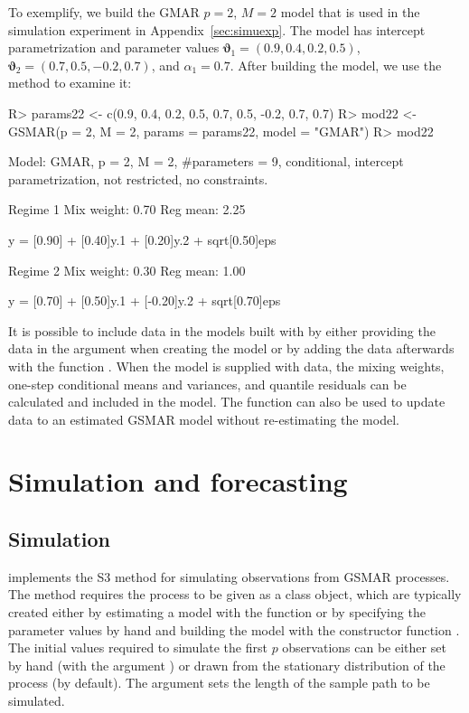 \documentclass[nojss]{jss} %
\begin{document}
To exemplify, we build the GMAR $p=2$, $M=2$ model that is used in the simulation experiment in Appendix~\ref{sec:simuexp}. The model has intercept parametrization and parameter values $\boldsymbol{\vartheta}_1 = (0.9, 0.4, 0.2, 0.5)$, $\boldsymbol{\vartheta}_2 = (0.7, 0.5, -0.2, 0.7)$, and $\alpha_1 = 0.7$. After building the model, we use the  method to examine it:
%
\begin{CodeChunk}
\begin{CodeInput}
R> params22 <- c(0.9, 0.4, 0.2, 0.5, 0.7, 0.5, -0.2, 0.7, 0.7)
R> mod22 <- GSMAR(p = 2, M = 2, params = params22, model = "GMAR")
R> mod22
\end{CodeInput}
\begin{CodeOutput}
Model:
 GMAR, p = 2, M = 2, #parameters = 9,
 conditional, intercept parametrization, not restricted, no constraints.

Regime 1
Mix weight: 0.70
Reg mean: 2.25

y = [0.90] + [0.40]y.1 + [0.20]y.2 + sqrt[0.50]eps

Regime 2
Mix weight: 0.30
Reg mean: 1.00

y = [0.70] + [0.50]y.1 + [-0.20]y.2 + sqrt[0.70]eps
\end{CodeOutput}
\end{CodeChunk}
%

It is possible to include data in the models built with  by either providing the data in the argument  when creating the model or by adding the data afterwards with the function . When the model is supplied with data, the mixing weights, one-step conditional means and variances, and quantile residuals can be calculated and included in the model. The function  can also be used to update data to an estimated GSMAR model without re-estimating the model.


\section{Simulation and forecasting}\label{sec:simufore}

\subsection{Simulation}\label{sec:simu}
 implements the S3 method  for simulating observations from GSMAR processes. The method requires the process to be given as a class  object, which are typically created either by estimating a model with the function  or by specifying the parameter values by hand and building the model with the constructor function . The initial values required to simulate the first $p$ observations can be either set by hand (with the argument ) or drawn from the stationary distribution of the process (by default). The argument  sets the length of the sample path to be simulated.
\end{document}
